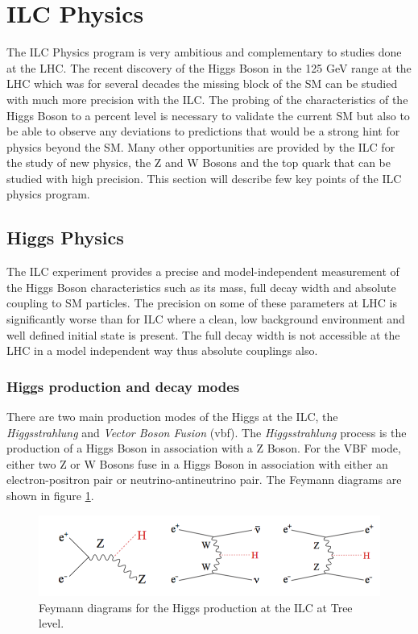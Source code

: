 \section{ILC Physics}
\label{sec:ILC_Physics}

The ILC Physics program is very ambitious and complementary to studies done at the LHC. The recent discovery of the Higgs Boson in the 125 GeV range at the LHC which was for several decades the missing block of the SM can be studied with much more precision with the ILC. The probing of the characteristics of the Higgs Boson to a percent level is necessary to validate the current SM but also to be able to observe any deviations to predictions that would be a strong hint for physics beyond the SM. Many other opportunities are provided by the ILC for the study of new physics, the Z and W Bosons and the top quark that can be studied with high precision. This section will describe few key points of the ILC physics program.

\subsection{Higgs Physics}

The ILC experiment provides a precise and model-independent measurement of the Higgs Boson characteristics such as its mass, full decay width and absolute coupling to SM particles. The precision on some of these parameters at LHC is significantly worse than for ILC where a clean, low background environment and well defined initial state is present. The full decay width is not accessible at the LHC in a model independent way thus absolute couplings also.

\subsubsection{Higgs production and decay modes}

There are two main production modes of the Higgs at the ILC, the \textit{Higgsstrahlung} and \textit{Vector Boson Fusion} (\acrshort{vbf}). The \textit{Higgsstrahlung} process is the production of a Higgs Boson in association with a Z Boson. For the VBF mode, either two Z or W Bosons fuse in a Higgs Boson in association with either an electron-positron pair or neutrino-antineutrino pair. The Feymann diagrams are shown in figure \ref{fig:HiggsProd}.

\begin{figure}[htbp!]
  \centering
  \includegraphics[width=1\linewidth]{chap2/fig/HiggsProd.png}
  \caption{Feymann diagrams for the Higgs production at the ILC at Tree level. \cite{ILC_TDR_Vol2}} \label{fig:HiggsProd}
\end{figure}

